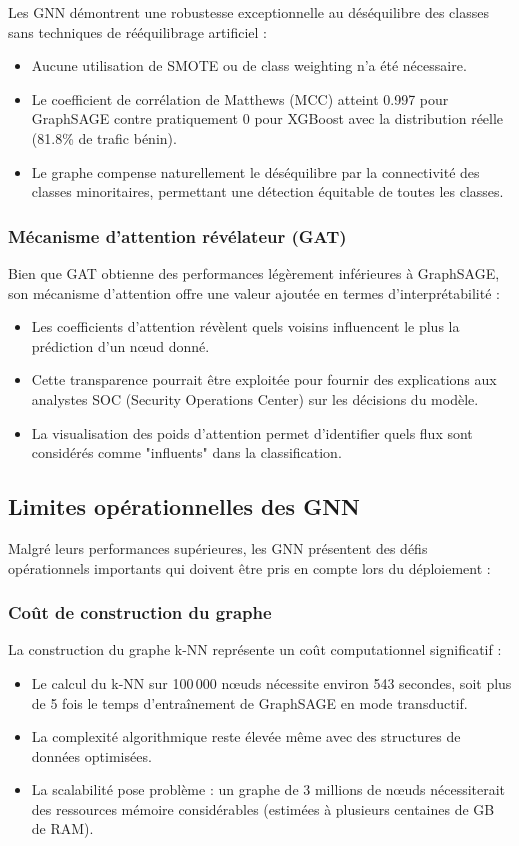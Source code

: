 ﻿\documentclass[11pt,a4paper]{article}
\begin{document}
Les GNN démontrent une robustesse exceptionnelle au déséquilibre des classes sans techniques de rééquilibrage artificiel :
\begin{itemize}
    \item Aucune utilisation de SMOTE ou de class weighting n'a été nécessaire.
    \item Le coefficient de corrélation de Matthews (MCC) atteint 0.997 pour GraphSAGE contre pratiquement 0 pour XGBoost avec la distribution réelle (81.8\% de trafic bénin).
    \item Le graphe compense naturellement le déséquilibre par la connectivité des classes minoritaires, permettant une détection équitable de toutes les classes.
\end{itemize}

\subsubsection{Mécanisme d'attention révélateur (GAT)}

Bien que GAT obtienne des performances légèrement inférieures à GraphSAGE, son mécanisme d'attention offre une valeur ajoutée en termes d'interprétabilité :
\begin{itemize}
    \item Les coefficients d'attention révèlent quels voisins influencent le plus la prédiction d'un nœud donné.
    \item Cette transparence pourrait être exploitée pour fournir des explications aux analystes SOC (Security Operations Center) sur les décisions du modèle.
    \item La visualisation des poids d'attention permet d'identifier quels flux sont considérés comme "influents" dans la classification.
\end{itemize}

\subsection{Limites opérationnelles des GNN}

Malgré leurs performances supérieures, les GNN présentent des défis opérationnels importants qui doivent être pris en compte lors du déploiement :

\subsubsection{Coût de construction du graphe}

La construction du graphe k-NN représente un coût computationnel significatif :
\begin{itemize}
    \item Le calcul du k-NN sur 100\,000 nœuds nécessite environ 543 secondes, soit plus de 5 fois le temps d'entraînement de GraphSAGE en mode transductif.
    \item La complexité algorithmique reste élevée même avec des structures de données optimisées.
    \item La scalabilité pose problème : un graphe de 3 millions de nœuds nécessiterait des ressources mémoire considérables (estimées à plusieurs centaines de GB de RAM).
\end{itemize}
\end{document}
